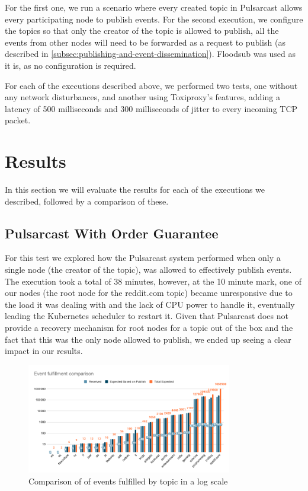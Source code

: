 For the first one, we run a scenario where every created topic in
Pulsarcast allows every participating node to publish events. For the second
execution, we configure the topics so that only the creator of the topic is
allowed to publish, all the events from other nodes will need to be forwarded
as a request to publish (as described in
\ref{subsec:publishing-and-event-dissemination}). Floodsub was used as it is,
as no configuration is required. 

For each of the executions described above, we performed two tests, one without
any network disturbances, and another using Toxiproxy's features, adding a
latency of 500 milliseconds and 300 milliseconds of jitter to every incoming
TCP packet. 

\section{Results}\label{results}

In this section we will evaluate the results for each of the executions we
described, followed by a comparison of these.

\subsection{Pulsarcast With Order Guarantee}\label{subsec:pulsarcast-with-order-guarantee}

For this test we explored how the Pulsarcast system performed when only a
single node (the creator of the topic), was allowed to effectively publish
events. The execution took a total of 38 minutes, however, at the 10 minute
mark, one of our nodes (the root node for the reddit.com topic) became
unresponsive due to the load it was dealing with and the lack of CPU power to
handle it, eventually leading the Kubernetes scheduler to restart it.  Given
that Pulsarcast does not provide a recovery mechanism for root nodes for a
topic out of the box and the fact that this was the only node allowed to
publish, we ended up seeing a clear impact in our results.

\begin{figure}[!htb]
  \centering
  \includegraphics[width=0.8\textwidth]{img/graph-pulsarcast-order-event-fulfillment-comparison.png}
  \caption{Comparison of of events fulfilled by topic in a log scale}
  \label{fig:graph-pulsarcast-order-event-fulfillment-comparison}
\end{figure}

